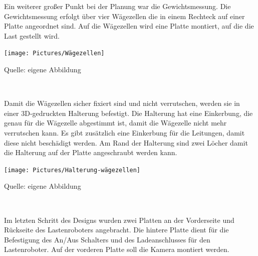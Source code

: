\documentclass[ngerman,12pt,a4paper]{article}
\begin{document}
		Ein weiterer großer Punkt bei der Planung war die Gewichtsmessung. Die Gewichtsmessung erfolgt über vier Wägezellen die in einem Rechteck auf einer Platte angeordnet sind. Auf die Wägezellen wird eine Platte montiert, auf die die Last gestellt wird.
		\begin{center} 
			\begin{minipage}[t]{0.4\textwidth}
				\texttt{[image: Pictures/Wägezellen]}
				\label{fig:Wägezellen}
				\vspace{-10pt}
				\begin{center}
					\par\small Quelle: eigene Abbildung 
				\end{center}
			\end{minipage} \\[0.75cm]
		\end{center}
		Damit die Wägezellen sicher fixiert sind und nicht verrutschen, werden sie in einer 3D-gedruckten Halterung befestigt. Die Halterung hat eine Einkerbung, die genau für die Wägezelle abgestimmt ist, damit die Wägezelle nicht mehr verrutschen kann. Es gibt zusätzlich eine Einkerbung für die Leitungen, damit diese nicht beschädigt werden. Am Rand der Halterung sind zwei Löcher damit die Halterung auf der Platte angeschraubt werden kann. 
		\begin{center} 
			\begin{minipage}[t]{0.6\textwidth}
				\texttt{[image: Pictures/Halterung-wägezellen]}
				\label{fig:Wägezellenhalterung}
				\vspace{-10pt}
				\begin{center}
					\par\small Quelle: eigene Abbildung 
				\end{center}
			\end{minipage} \\[0.75cm]
		\end{center}
		Im letzten Schritt des Designs wurden zwei Platten an der Vorderseite und Rückseite des Lastenroboters angebracht. Die hintere Platte dient für die Befestigung des An/Aus Schalters und des Ladeanschlusses für den Lastenroboter. Auf der vorderen Platte soll die Kamera montiert werden.
\end{document}
